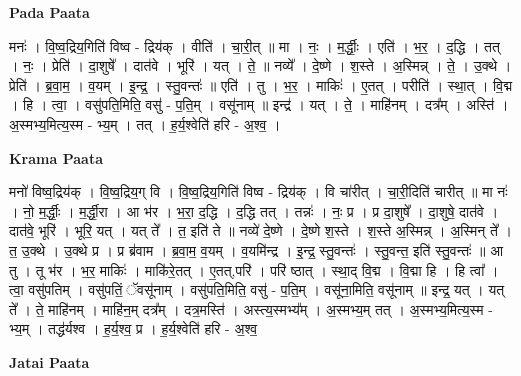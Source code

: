 \documentclass[17pt]{extarticle}
\begin{document}
\textbf{Pada Paata} \newline

मनः॑ । वि॒ष्व॒द्रिय॒गिति॑ विष्व - द्रिय॑क् । वीति॑ । चा॒री॒त् ॥ मा । नः॒ । म॒र्द्धीः॒ । एति॑ । भ॒र॒ । द॒द्धि । तत् । नः॒ । प्रेति॑ । दा॒शुषे᳚ । दात॑वे । भूरि॑ । यत् । ते॒ ॥ नव्ये᳚ । दे॒ष्णे । श॒स्ते । अ॒स्मिन्न् । ते॒ । उ॒क्थे । प्रेति॑ । ब्र॒वा॒म॒ । व॒यम् । इ॒न्द्र॒ । स्तु॒वन्तः॑ ॥ एति॑ । तु । भ॒र॒ । माकिः॑ । ए॒तत् । परीति॑ । स्था॒त् । वि॒द्म । हि । त्वा॒ । वसु॑पति॒मिति॒ वसु॑ - प॒ति॒म् । वसू॑नाम् ॥ इन्द्र॑ । यत् । ते॒ । माहि॑नम् । दत्र᳚म् । अस्ति॑ । अ॒स्मभ्य॒मित्य॒स्म - भ्य॒म् । तत् । ह॒र्य॒श्वेति॑ हरि - अ॒श्व॒ ।  \newline


\textbf{Krama Paata} \newline

मनो॑ विष्व॒द्रिय॑क् । वि॒ष्व॒द्रिय॒ग् वि । वि॒ष्व॒द्रिय॒गिति॑ विष्व - द्रिय॑क् । वि चा॑रीत् । चा॒री॒दिति॑ चारीत् ॥ मा नः॑ । नो॒ म॒र्द्धीः॒ । म॒र्द्धी॒रा । आ भ॑र । भ॒रा॒ द॒द्धि । द॒द्धि तत् । तन्नः॑ । नः॒ प्र । प्र दा॒शुषे᳚ । दा॒शुषे॒ दात॑वे । दात॑वे॒ भूरि॑ । भूरि॒ यत् । यत् ते᳚ । त॒ इति॑ ते ॥ नव्ये॑ दे॒ष्णे । दे॒ष्णे श॒स्ते । श॒स्ते अ॒स्मिन्न् । अ॒स्मिन् ते᳚ । त॒ उ॒क्थे । उ॒क्थे प्र । प्र ब्र॑वाम । ब्र॒वा॒म॒ व॒यम् । व॒यमि॑न्द्र । इ॒न्द्र॒ स्तु॒वन्तः॑ । स्तु॒वन्त॒ इति॑ स्तु॒वन्तः॑ ॥ आ तु । तू भ॑र । भ॒र॒ माकिः॑ । माकि॑रे॒तत् । ए॒तत्,परि॑ । परि॑ ष्ठात् । स्था॒द् वि॒द्म । वि॒द्मा हि । हि त्वा᳚ । त्वा॒ वसु॑पतिम् । वसु॑पतिं॒ ॅवसू॑नाम् । वसु॑पति॒मिति॒ वसु॑ - प॒ति॒म् । वसू॑ना॒मिति॒ वसू॑नाम् ॥ इन्द्र॒ यत् । यत् ते᳚ । ते॒ माहि॑नम् । माहि॑न॒म् दत्र᳚म् । दत्र॒मस्ति॑ । अस्त्य॒स्मभ्य᳚म् । अ॒स्मभ्य॒म् तत् । अ॒स्मभ्य॒मित्य॒स्म - भ्य॒म् । तद्ध॑र्यश्व । ह॒र्य॒श्व॒ प्र । 
ह॒र्य॒श्वेति॑ हरि - अ॒श्व॒ \newline

\textbf{Jatai Paata} \newline
\end{document}
